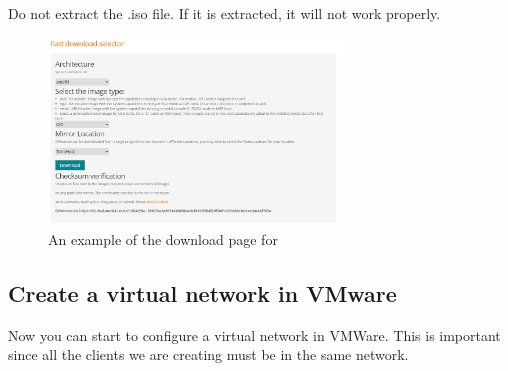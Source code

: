 
\begin{importantblock}
    Do not extract the .iso file. If it is extracted, it will not work properly.
\end{importantblock}

\begin{figure}[h!]
    \centering
    \includegraphics[width=0.7\textwidth]{Images/opnsense_download.PNG}
    \caption{An example of the download page for \opnsense}
    \label{opnsense:download}
\end{figure}


\subsection{Create a virtual network in VMware} \label{virt_network}
Now you can start to configure a virtual network in VMWare. This is important since all the clients we are creating must be in the same network.

